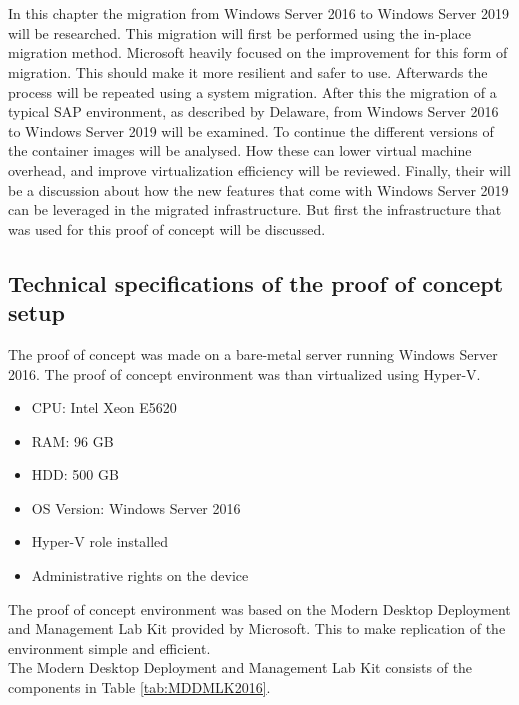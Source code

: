 \chapter{}
\label{ch:methodologie}

In this chapter the migration from Windows Server 2016 to Windows Server 2019 will be researched. This migration will first be performed using the in-place migration method. Microsoft heavily focused on the improvement for this form of migration. This should make it more resilient and safer to use. Afterwards the process will be repeated using a system migration. After this the migration of a typical SAP environment, as described by Delaware, from Windows Server 2016 to Windows Server 2019 will be examined. To continue the different versions of the container images will be analysed. How these can lower virtual machine overhead, and improve virtualization efficiency will be reviewed. Finally, their will be a discussion about how the new features that come with Windows Server 2019 can be leveraged in the migrated infrastructure. But first the infrastructure that was used for this proof of concept will be discussed.

\section{Technical specifications of the proof of concept setup}
The proof of concept was made on a bare-metal server running Windows Server 2016. The proof of concept environment was than virtualized using Hyper-V. 
\begin{itemize}
	\item CPU: Intel Xeon E5620
	\item RAM: 96 GB 
	\item HDD: 500 GB
	\item OS Version: Windows Server 2016
	\item Hyper-V role installed
	\item Administrative rights on the device
\end{itemize}
The proof of concept environment was based on the Modern Desktop Deployment and Management Lab Kit provided by Microsoft. \autocite{Gallagher2018}
This to make replication of the environment simple and efficient.
\\
The Modern Desktop Deployment and Management Lab Kit consists of the components in Table \ref{tab:MDDMLK2016}.
\\

